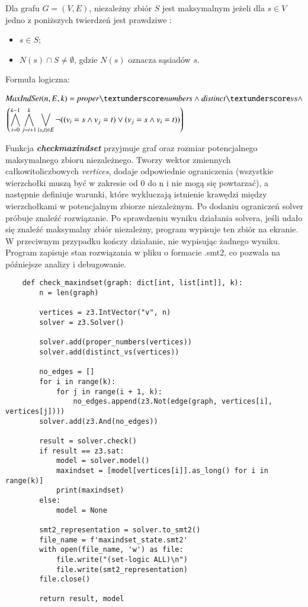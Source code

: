 Dla grafu $G = (V, E)$, niezależny zbiór \(S\) jest maksymalnym jeżeli dla $s \in V$ jedno z poniższych twierdzeń jest prawdziwe \cite{maxIndSetDef}:

\begin{itemize}
	\item $s \in S$;
	\item $N(s) \cap S \neq \emptyset$, gdzie \(N(s)\) oznacza sąsiadów \(s\).
\end{itemize}

Formuła logiczna:

\begin{align*}
	&\MaxIndSet(n, E, k) = \propernumbers \land \distinctvs \land \\
	&\left( \bigwedge_{i=0}^{k-1} \bigwedge_{j=i+1}^{k} \bigvee_{\{s,t\} \in E} \lnot((v_i = s \land v_j = t) \lor (v_j = s \land v_i = t)) \right)	
\end{align*}

Funkcja \textit{\textbf{check\textunderscore maxindset}} przyjmuje graf oraz rozmiar potencjalnego maksymalnego zbioru niezależnego. Tworzy wektor zmiennych całkowitoliczbowych \textit{vertices}, dodaje odpowiednie ograniczenia (wszystkie wierzchołki muszą być w zakresie od 0 do n i nie mogą się powtarzać), a następnie definiuje warunki, które wykluczają istnienie krawędzi między wierzchołkami w potencjalnym zbiorze niezależnym. Po dodaniu ograniczeń solver próbuje znaleźć rozwiązanie. Po sprawdzeniu wyniku działania solvera, jeśli udało się znaleźć maksymalny zbiór niezależny, program wypisuje ten zbiór na ekranie. W przeciwnym przypadku kończy działanie, nie wypisując żadnego wyniku. Program zapisuje stan rozwiązania w pliku o formacie .smt2, co pozwala na późniejsze analizy i debugowanie.

\begin{lstlisting}
	def check_maxindset(graph: dict[int, list[int]], k):
		n = len(graph)
		
		vertices = z3.IntVector("v", n)
		solver = z3.Solver()
		
		solver.add(proper_numbers(vertices))
		solver.add(distinct_vs(vertices))
		
		no_edges = []
		for i in range(k):
			for j in range(i + 1, k):
				no_edges.append(z3.Not(edge(graph, vertices[i], vertices[j])))
		solver.add(z3.And(no_edges))
		
		result = solver.check() 
		if result == z3.sat:
			model = solver.model()
			maxindset = [model[vertices[i]].as_long() for i in range(k)]
			print(maxindset)
		else:
			model = None
		
		smt2_representation = solver.to_smt2()
		file_name = f'maxindset_state.smt2'
		with open(file_name, 'w') as file:
			file.write("(set-logic ALL)\n")
			file.write(smt2_representation)  
		file.close()
		
		return result, model
\end{lstlisting}

